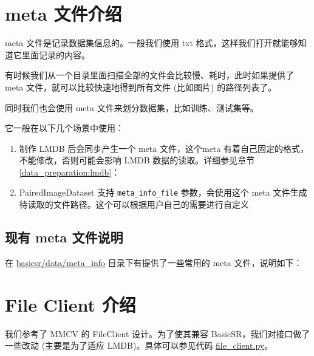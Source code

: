 \documentclass[../main.tex]{subfiles}
\begin{document}
\section{meta 文件介绍}\label{data_preparation:meta_file}

meta 文件是记录数据集信息的。一般我们使用 txt 格式，这样我们打开就能够知道它里面记录的内容。

有时候我们从一个目录里面扫描全部的文件会比较慢、耗时，此时如果提供了 meta 文件，就可以比较快速地得到所有文件 (比如图片) 的路径列表了。

同时我们也会使用 meta 文件来划分数据集，比如训练、测试集等。

它一般在以下几个场景中使用：

\begin{enumerate}
    \item 制作 LMDB 后会同步产生一个 meta 文件，这个meta 有着自己固定的格式，不能修改，否则可能会影响 LMDB 数据的读取。详细参见章节\ref{data_preparation:lmdb}：
    \item PairedImageDataset 支持 \texttt{meta_info_file} 参数，会使用这个 meta 文件生成待读取的文件路径。这个可以根据用户自己的需要进行自定义
\end{enumerate}


\subsection{现有 meta 文件说明}\label{data_preparation:existing_meta_file}

在 \href{https://github.com/XPixelGroup/BasicSR/tree/master/basicsr/data/meta_info}{basicsr/data/meta_info} 目录下有提供了一些常用的 meta 文件，说明如下：


\section{File Client 介绍}\label{data_preparation:file_client}

我们参考了 MMCV 的 FileClient 设计。为了使其兼容 BasicSR，我们对接口做了一些改动 (主要是为了适应 LMDB)。具体可以参见代码 \href{https://github.com/XPixelGroup/BasicSR/blob/master/basicsr/utils/file_client.py}{file\_client.py}。

\end{document}
